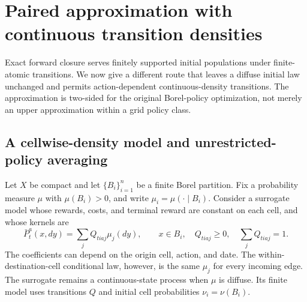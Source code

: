 \section{Paired approximation with continuous transition densities}\label{sec:density50}
Exact forward closure serves finitely supported initial populations under finite-atomic transitions. We now give a different route that leaves a diffuse initial law unchanged and permits action-dependent continuous-density transitions. The approximation is two-sided for the original Borel-policy optimization, not merely an upper approximation within a grid policy class.

\subsection{A cellwise-density model and unrestricted-policy averaging}
Let $X$ be compact and let $\{B_i\}_{i=1}^n$ be a finite Borel partition. Fix a probability measure $\mu$ with $\mu(B_i)>0$, and write $\mu_i=\mu(\cdot\mid B_i)$. Consider a surrogate model whose rewards, costs, and terminal reward are constant on each cell, and whose kernels are
\begin{equation}\label{eq:block-kernel50}
 \bar P_t^a(x,dy)=\sum_j Q_{tiaj}\mu_j(dy),\qquad x\in B_i,
 \quad Q_{tiaj}\ge0,\quad\sum_jQ_{tiaj}=1.
\end{equation}
The coefficients can depend on the origin cell, action, and date. The within-destination-cell conditional law, however, is the same $\mu_j$ for every incoming edge. The surrogate remains a continuous-state process when $\mu$ is diffuse. Its finite model uses transitions $Q$ and initial cell probabilities $\nu_i=\nu(B_i)$.

